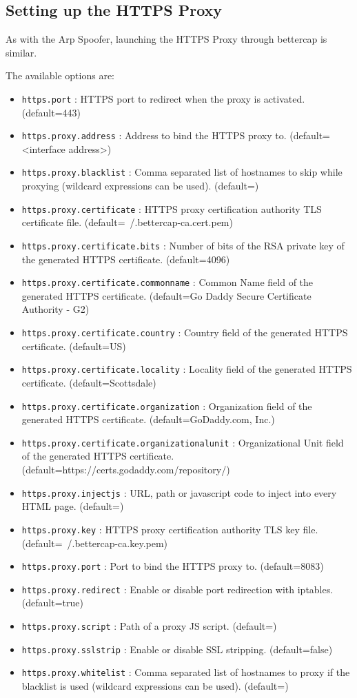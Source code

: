 \documentclass[status=normal,cover=tesi,language=en]{gmeepd}
\begin{document}
\subsection{Setting up the HTTPS Proxy}

As with the Arp Spoofer, launching the HTTPS Proxy through bettercap is similar.

The available options are:

\begin{itemize}
 \item \verb|https.port| : HTTPS port to redirect when the proxy is activated. (default=443)
 \item \verb|https.proxy.address| : Address to bind the HTTPS proxy to. (default=<interface address>)
 \item \verb|https.proxy.blacklist| : Comma separated list of hostnames to skip while proxying (wildcard expressions can be used). (default=)
 \item \verb|https.proxy.certificate| : HTTPS proxy certification authority TLS certificate file. (default=~/.bettercap-ca.cert.pem)
 \item \verb|https.proxy.certificate.bits| : Number of bits of the RSA private key of the generated HTTPS certificate. (default=4096)
 \item \verb|https.proxy.certificate.commonname| : Common Name field of the generated HTTPS certificate. (default=Go Daddy Secure Certificate Authority - G2)
 \item \verb|https.proxy.certificate.country| : Country field of the generated HTTPS certificate. (default=US)
 \item \verb|https.proxy.certificate.locality| : Locality field of the generated HTTPS certificate. (default=Scottsdale)
 \item \verb|https.proxy.certificate.organization| : Organization field of the generated HTTPS certificate. (default=GoDaddy.com, Inc.)
 \item \verb|https.proxy.certificate.organizationalunit| : Organizational Unit field of the generated HTTPS certificate. \newline(default=https://certs.godaddy.com/repository/)
 \item \verb|https.proxy.injectjs| : URL, path or javascript code to inject into every HTML page. (default=)
 \item \verb|https.proxy.key| : HTTPS proxy certification authority TLS key file. (default=~/.bettercap-ca.key.pem)
 \item \verb|https.proxy.port| : Port to bind the HTTPS proxy to. (default=8083)
 \item \verb|https.proxy.redirect| : Enable or disable port redirection with iptables. (default=true)
 \item \verb|https.proxy.script| : Path of a proxy JS script. (default=)
 \item \verb|https.proxy.sslstrip| : Enable or disable SSL stripping. (default=false)
 \item \verb|https.proxy.whitelist| : Comma separated list of hostnames to proxy if the blacklist is used (wildcard expressions can be used). (default=)
\end{itemize}
\end{document}
